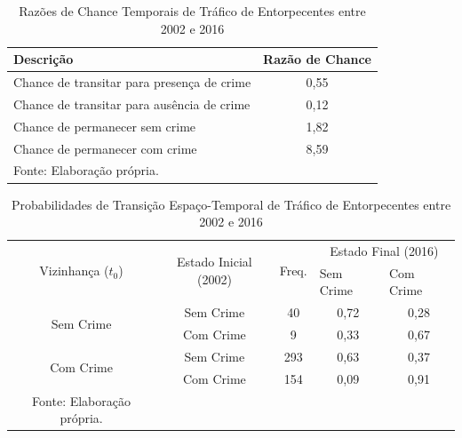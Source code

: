 \documentclass[12pt,openright,oneside,a4paper,english,french,spanish]{abntex2}
\numberwithin{table}{section} %
\numberwithin{figure}{section} %
\begin{document}
\begin{subappendices}
\begin{table}[H]
\centering
\caption{Razões de Chance Temporais de Tráfico de Entorpecentes entre 2002 e 2016}
        \begin{tabular}{lc}
            \hline
            {\textbf{Descrição}} & {\textbf{Razão de Chance}} \\\hline
            {Chance de transitar para presença de crime} & {0,55} \\
            {Chance de transitar para ausência de crime} & {0,12} \\
            {Chance de permanecer sem crime} & {1,82} \\
            {Chance de permanecer com crime} & {8,59} \\\hline
            \tiny Fonte: Elaboração própria.
        \end{tabular}
    \label{tab:odds_tempo_trafico_2002_2016}
\end{table}


\begin{table}[H]
\centering
\caption{Probabilidades de Transição Espaço-Temporal de Tráfico de Entorpecentes entre 2002 e 2016}
        \begin{tabular}{ccccc}
            \hline
            \multirow{2}{*}{Vizinhança ($t_0$)} & \multirow{2}{*}{Estado Inicial (2002)} & \multirow{2}{*}{Freq.} & \multicolumn{2}{c}{Estado Final (2016)}  \\\cline{4-5} %
                                        & & & \multicolumn{1}{l}{Sem Crime} & \multicolumn{1}{l}{Com Crime} \\\hline
            \multirow{2}{*}{Sem Crime} & {Sem Crime} & 40 &  {0,72} & {0,28} \\
                                       & {Com Crime} & 9 &   {0,33} & {0,67} \\\hline
            \multirow{2}{*}{Com Crime} & {Sem Crime} & 293 & {0,63} & {0,37} \\
                                       & {Com Crime} & 154 & {0,09} & {0,91} \\\hline
            \tiny Fonte: Elaboração própria.
        \end{tabular}
    \label{tab:prob_espaco_tempo_trafico_2002_2016}
\end{table}



\end{subappendices}
\end{document}

